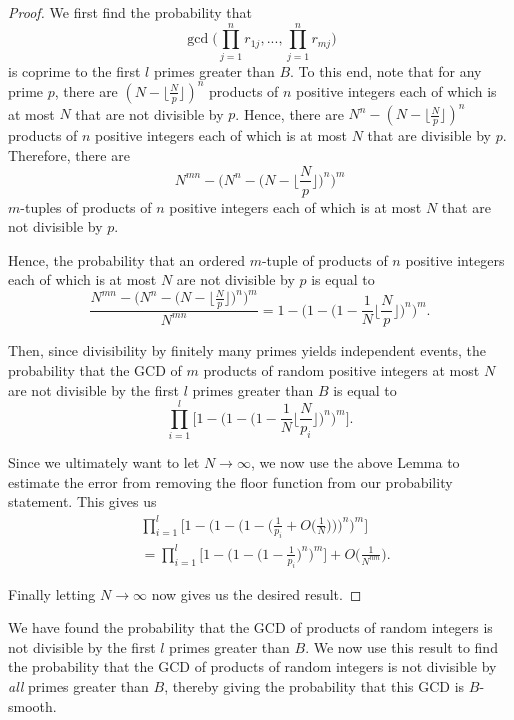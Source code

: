 \documentclass[12pt]{amsart}
\theoremstyle{definition}
\begin{document}
\begin{proof}
	We first find the probability that 
	$$\gcd\Big(\prod_{j=1}^nr_{1j}, ..., \prod_{j=1}^n r_{mj}\Big)$$
	is coprime to the first $l$ primes greater than $B$.  To this end, note that for any prime $p$, there are $(N - \lfloor\frac{N}{p}\rfloor)^n$ products of $n$ positive integers each of which is at most $N$ that are not divisible by $p$. Hence, there are $N^n - (N - \lfloor\frac{N}{p}\rfloor)^n$ products of $n$ positive integers each of which is at most $N$ that are divisible by $p$. Therefore, there are 
	$$N^{mn} - \Big(N^n - \Big(N - \Big\lfloor\frac{N}{p}\Big\rfloor\Big)^n\Big)^m$$
	$m$-tuples of products of $n$ positive integers each of which is at most $N$ that are not divisible by $p$.
	
	Hence, the probability that an ordered $m$-tuple of products of $n$ positive integers each of which is at most $N$ are not divisible by $p$ is equal to
	$$\frac{N^{mn} - \Big(N^n - \Big(N - \Big\lfloor\frac{N}{p}\Big\rfloor\Big)^n\Big)^m}{N^{mn}} = 1 - \Big(1 - \Big(1 - \frac{1}{N} \Big\lfloor\frac{N}{p}\Big\rfloor\Big)^n\Big)^m.$$
	
	Then, since divisibility by finitely many primes yields independent events, the probability that the GCD of $m$ products of random positive integers at most $N$ are not divisible by the first $l$ primes greater than $B$ is equal to
	$$\prod_{i=1}^l \Big[1 - \Big(1 - \Big(1 - \frac{1}{N}\Big\lfloor\frac{N}{p_i}\Big\rfloor\Big)^n\Big)^m\Big].$$
	
	Since we ultimately want to let $N \to \infty$, we now use the above Lemma to estimate the error from removing the floor function from our probability statement. This gives us
	\begin{align*}& \prod_{i=1}^l \Big[1 - \Big(1 - \Big(1 - \Big(\frac{1}{p_i} + O\Big(\frac{1}{N}\Big)\Big) \Big)^n\Big)^m\Big]\\
		&= \prod_{i=1}^l \Big[1 - \Big(1 - \Big(1 - \frac{1}{p_i}  \Big)^n\Big)^m\Big] + O\Big(\frac{1}{N^{nm}}\Big).\end{align*}
	
	\noindent Finally letting $N \to \infty$ now gives us the desired result.
\end{proof}

We have found the probability that the GCD of products of random integers is not divisible by the first \(l\) primes greater than \(B\). We now use this result to find the probability that the GCD of products of random integers is not divisible by \textit{all} primes greater than $B$, thereby giving the probability that this GCD is $B$-smooth.
\end{document}
